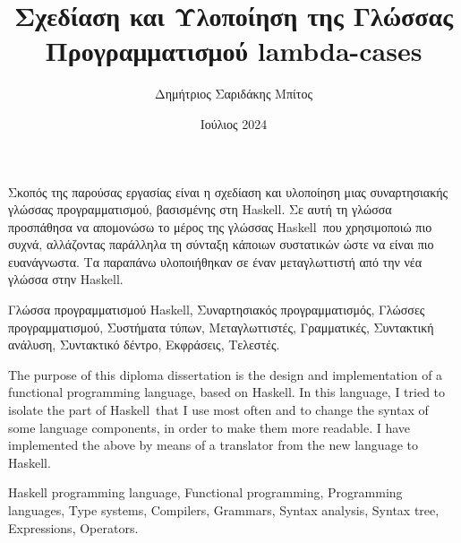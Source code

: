 \documentclass[diploma]{softlab-thesis}
\def\H{Haskell}
\begin{document}

\frontmatter

\title{Σχεδίαση και Υλοποίηση της Γλώσσας Προγραμματισμού lambda-cases}
\author{Δημήτριος Σαριδάκης Μπίτος}
\date{Ιούλιος 2024}




\maketitle



\begin{abstractgr}%
  Σκοπός της παρούσας εργασίας είναι η σχεδίαση και υλοποίηση μιας
  συναρτησιακής γλώσσας προγραμματισμού, βασισμένης στη \H. Σε αυτή
  τη γλώσσα προσπάθησα να απομονώσω το μέρος της γλώσσας \H\ που
  χρησιμοποιώ πιο συχνά, αλλάζοντας παράλληλα τη σύνταξη κάποιων
  συστατικών ώστε να είναι πιο ευανάγνωστα. Τα παραπάνω υλοποιήθηκαν
  σε έναν μεταγλωττιστή από την νέα γλώσσα στην \H.

\begin{keywordsgr}
  Γλώσσα προγραμματισμού Haskell,
  Συναρτησιακός προγραμματισμός,
  Γλώσσες προγραμματισμού,
  Συστήματα τύπων,
  Μεταγλωττιστές,
  Γραμματικές,
  Συντακτική ανάλυση,
  Συντακτικό δέντρο,
  Εκφράσεις,
  Τελεστές.
\end{keywordsgr}
\end{abstractgr}


\begin{abstracten}%
  The purpose of this diploma dissertation is the design and implementation
  of a functional programming language, based on \H. In this language, I
  tried to isolate the part of \H\ that I use most often and to change the
  syntax of some language components, in order to make them more readable.
  I have implemented the above by means of a translator from the new language
  to \H.

\begin{keywordsen}
  Haskell programming language,
  Functional programming,
  Programming languages,
  Type systems,
  Compilers,
  Grammars,
  Syntax analysis,
  Syntax tree,
  Expressions,
  Operators.
\end{keywordsen}
\end{abstracten}
\end{document}
